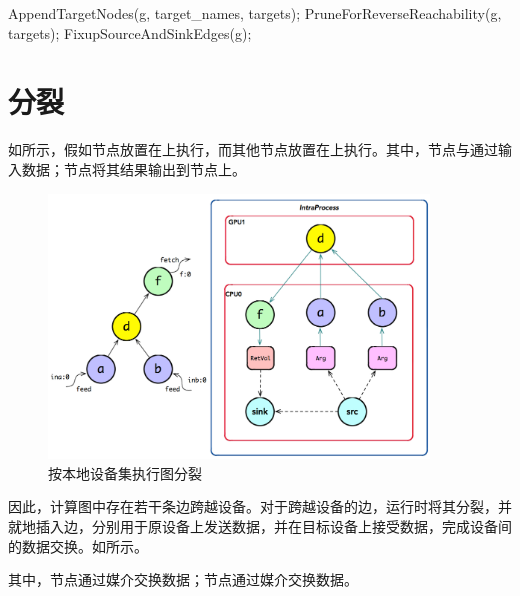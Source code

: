 \begin{content}
\begin{leftbar}
\begin{c++}
{  AppendTargetNodes(g, target_names, targets);
  PruneForReverseReachability(g, targets);
  FixupSourceAndSinkEdges(g);
}
\end{c++}
\end{leftbar}

\section{分裂}
\label{sec:graph-operation-split}

如所示，假如节点放置在上执行，而其他节点放置在上执行。其中，节点与通过输入数据；节点将其结果输出到节点上。

\begin{figure}[H]
\centering
\includegraphics[width=0.9\textwidth]{figures/local-graph-split-by-device.png}
\caption{按本地设备集执行图分裂}
 \label{fig:local-graph-split-by-device}
\end{figure}

因此，计算图中存在若干条边跨越设备。对于跨越设备的边，运行时将其分裂，并就地插入边，分别用于原设备上发送数据，并在目标设备上接受数据，完成设备间的数据交换。如所示。

其中，节点通过媒介交换数据；节点通过媒介交换数据。


\end{content}
